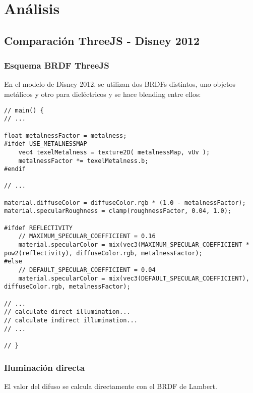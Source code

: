 \chapter{An\'alisis}

\section{Comparaci\'on ThreeJS - Disney 2012}
    \subsection{Esquema BRDF ThreeJS}
        En el modelo de Disney 2012, se utilizan dos BRDFs distintos, uno objetos metálicos y
        otro para dieléctricos y se hace blending entre ellos:
    \singlespacing
    \begin{lstlisting}[caption=My Javascript Example]
// main() {
// ...

float metalnessFactor = metalness;
#ifdef USE_METALNESSMAP
    vec4 texelMetalness = texture2D( metalnessMap, vUv );
    metalnessFactor *= texelMetalness.b;
#endif

// ...

material.diffuseColor = diffuseColor.rgb * (1.0 - metalnessFactor);
material.specularRoughness = clamp(roughnessFactor, 0.04, 1.0);

#ifdef REFLECTIVITY
    // MAXIMUM_SPECULAR_COEFFICIENT = 0.16
    material.specularColor = mix(vec3(MAXIMUM_SPECULAR_COEFFICIENT * pow2(reflectivity), diffuseColor.rgb, metalnessFactor);
#else
    // DEFAULT_SPECULAR_COEFFICIENT = 0.04
    material.specularColor = mix(vec3(DEFAULT_SPECULAR_COEFFICIENT), diffuseColor.rgb, metalnessFactor);

// ...
// calculate direct illumination...
// calculate indirect illumination...
// ...
                                 
// }
    \end{lstlisting}

    \subsection{Iluminaci\'on directa}
        El valor del difuso se calcula directamente con el BRDF de Lambert.

